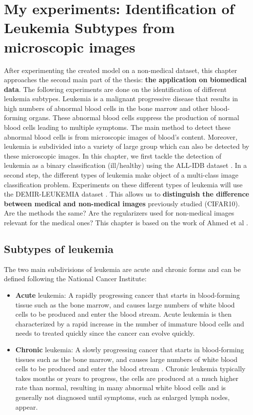 \documentclass[11pt, openany]{report}
\theoremstyle{plain}
\theoremstyle{definition}
\theoremstyle{remark}
\begin{document}
\chapter{My experiments: Identification of Leukemia Subtypes from microscopic images} \label{chap:leuk}

After experimenting the created model on a non-medical dataset, this chapter approaches the second main part of the thesis: \textbf{the application on biomedical data}. The following experiments are done on the identification of different leukemia subtypes. 
Leukemia is a malignant progressive disease that results in high numbers of abnormal blood cells in the bone marrow and other blood-forming organs. These abnormal blood cells suppress the production of normal blood cells leading to multiple symptoms. The main method to detect these abnormal blood cells is from microscopic images of blood's content. Moreover, leukemia is subdivided into a variety of large group which can also be detected by these microscopic images. In this chapter, we first tackle the detection of leukemia as a binary classification (ill/healthy) using the ALL-IDB dataset \cite{ALL-IDB}. In a second step, the different types of leukemia make object of a multi-class image classification problem. Experiments on these different types of leukemia will use the DEMIR-LEUKEMIA dataset \cite{leukemia}. This allows us to \textbf{distinguish the difference between medical and non-medical images} previously studied (CIFAR10). Are the methods the same? Are the regularizers used for non-medical images relevant for the medical ones? This chapter is based on the work of Ahmed et al \cite{leukemia}. 


\section{Subtypes of leukemia}
The two main subdivisions of leukemia are acute and chronic forms and can be defined following the National Cancer Institute: 
\begin{itemize}
\item \textbf{Acute} leukemia: A rapidly progressing cancer that starts in blood-forming tissue such as the bone marrow, and causes large numbers of white blood cells to be produced and enter the blood stream\cite{NCI}. Acute leukemia is then characterized by a rapid increase in the number of immature blood cells and needs to treated quickly since the cancer can evolve quickly. 
\item \textbf{Chronic} leukemia: A slowly progressing cancer that starts in blood-forming tissues such as the bone marrow, and causes large numbers of white blood cells to be produced and enter the blood stream \cite{NCI}. Chronic leukemia typically takes months or years to progress, the cells are produced at a much higher rate than normal, resulting in many abnormal white blood cells and is generally not diagnosed until symptoms, such as enlarged lymph nodes, appear.
\end{itemize} 
\end{document}
